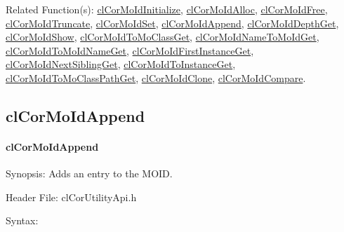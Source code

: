 \begin{flushleft}
\begin{Desc}
\item[Related Function(s):]\hyperlink{pagecor100}{cl\-Cor\-MoId\-Initialize}, \hyperlink{pagecor113}{cl\-Cor\-MoId\-Alloc}, 
\hyperlink{pagecor114}{cl\-Cor\-MoId\-Free},
\hyperlink{pagecor115}{cl\-Cor\-MoId\-Truncate}, 
\hyperlink{pagecor116}{cl\-Cor\-MoId\-Set}, 
\hyperlink{pagecor117}{cl\-Cor\-MoId\-Append}, 
\hyperlink{pagecor118}{cl\-Cor\-MoId\-Depth\-Get}, 
\hyperlink{pagecor119}{cl\-Cor\-MoId\-Show}, 
\hyperlink{pagecor120}{cl\-Cor\-MoId\-To\-Mo\-Class\-Get}, 
\hyperlink{pagecor121}{cl\-Cor\-MoId\-Name\-To\-MoId\-Get}, 
\hyperlink{pagecor122}{cl\-Cor\-MoId\-To\-MoId\-Name\-Get}, 
\hyperlink{pagecor123}{cl\-Cor\-MoId\-First\-Instance\-Get},
\hyperlink{pagecor124}{cl\-Cor\-MoId\-Next\-Sibling\-Get}, 
\hyperlink{pagecor125}{cl\-Cor\-MoId\-To\-Instance\-Get}, 
\hyperlink{pagecor126}{cl\-Cor\-MoId\-To\-Mo\-Class\-Path\-Get}, 
\hyperlink{pagecor127}{cl\-Cor\-MoId\-Clone}, 
\hyperlink{pagecor128}{cl\-Cor\-MoId\-Compare}.\end{Desc}
\newpage


\subsection{clCorMoIdAppend}
\hypertarget{pagecor117}{}\paragraph{cl\-Cor\-MoId\-Append}\label{pagecor117}
\begin{Desc}
\item[Synopsis:]Adds an entry to the MOID.\end{Desc}
\begin{Desc}
\item[Header File:]clCorUtilityApi.h\end{Desc}
\begin{Desc}
\item[Syntax:]


\end{Desc}
\end{flushleft}

